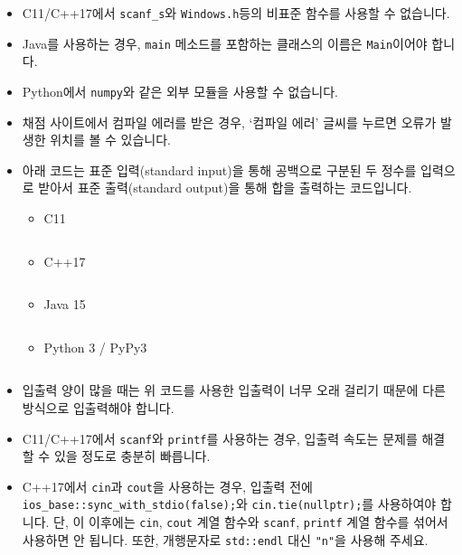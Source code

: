 \begin{itemize}[noitemsep]
\begin{itemize}[noitemsep,topsep=0pt]
    \end{itemize}

    \item C11/C++17에서 \texttt{scanf\_s}와 \texttt{Windows.h}등의 비표준 함수를 사용할 수 없습니다.
    \item Java를 사용하는 경우, \texttt{main} 메소드를 포함하는 클래스의 이름은 \texttt{Main}이어야 합니다.
    \item Python에서 \texttt{numpy}와 같은 외부 모듈을 사용할 수 없습니다.
    \item 채점 사이트에서 컴파일 에러를 받은 경우, `컴파일 에러' 글씨를 누르면 오류가 발생한 위치를 볼 수 있습니다.

    \item 아래 코드는 표준 입력(standard input)을 통해 공백으로 구분된 두 정수를 입력으로 받아서 표준 출력(standard output)을 통해 합을 출력하는 코드입니다.


    \begin{itemize}[noitemsep]
        \item C11%
        \inputminted[frame=lines,baselinestretch=1.2,linenos]{c}{rule-example-code/c11-1000.c}
        \item C++17%
        \inputminted[frame=lines,baselinestretch=1.2,linenos]{cpp}{rule-example-code/cpp17-1000.cpp}
        \item Java 15%
        \inputminted[frame=lines,baselinestretch=1.2,linenos]{java}{rule-example-code/java-1000.java}
        \item Python 3 / PyPy3%
        \inputminted[frame=lines,baselinestretch=1.2,linenos]{python}{rule-example-code/py3-1000.py}
    \end{itemize}

    \item 입출력 양이 많을 때는 위 코드를 사용한 입출력이 너무 오래 걸리기 때문에 다른 방식으로 입출력해야 합니다.

    \item C11/C++17에서 \texttt{scanf}와 \texttt{printf}를 사용하는 경우, 입출력 속도는 문제를 해결할 수 있을 정도로 충분히 빠릅니다.
    \item C++17에서 \texttt{cin}과 \texttt{cout}을 사용하는 경우, 입출력 전에 \texttt{ios\_base::sync\_with\_stdio(false);}와 \texttt{cin.tie(nullptr);}를 사용하여야 합니다. 단, 이 이후에는 \texttt{cin}, \texttt{cout} 계열 함수와 \texttt{scanf}, \texttt{printf} 계열 함수를 섞어서 사용하면 안 됩니다. 또한, 개행문자로 \texttt{std::endl} 대신 \texttt{"n"}을 사용해 주세요. 


\end{itemize}
